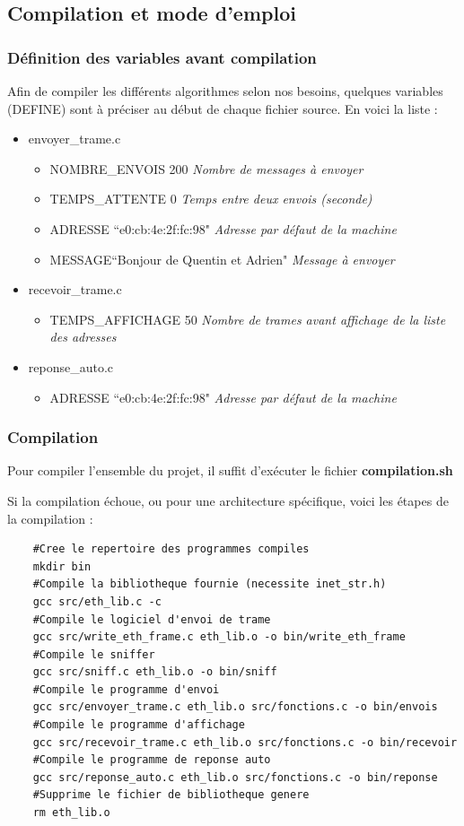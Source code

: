 \documentclass[a4paper,11pt]{article}
\begin{document}
	\subsection{Compilation et mode d'emploi}
		\subsubsection{Définition des variables avant compilation}
		Afin de compiler les différents algorithmes selon nos besoins, quelques variables (DEFINE) sont à préciser au début de chaque fichier source. En voici la liste :
		\begin{itemize}
		\item envoyer\_trame.c
			\begin{itemize}
			\item NOMBRE\_ENVOIS 200 \textit{Nombre de messages à envoyer}
			\item TEMPS\_ATTENTE 0    \textit{Temps entre deux envois (seconde)}
			\item ADRESSE ``e0:cb:4e:2f:fc:98" \textit{Adresse par défaut de la machine}
			\item MESSAGE``Bonjour de Quentin et Adrien" \textit{Message à envoyer}
			\end{itemize}
		\item recevoir\_trame.c
			\begin{itemize}
			\item TEMPS\_AFFICHAGE 50 \textit{Nombre de trames avant affichage de la liste des adresses}
			\end{itemize}
		\item reponse\_auto.c
			\begin{itemize}
			\item ADRESSE ``e0:cb:4e:2f:fc:98" \textit{Adresse par défaut de la machine}
			\end{itemize}
		\end{itemize}
		\subsubsection{Compilation}
		Pour compiler l'ensemble du projet, il suffit d'exécuter le fichier \textbf{compilation.sh}
		
		Si la compilation échoue, ou pour une architecture spécifique, voici les étapes de la compilation :
		\lstset{language=bash}
		\begin{lstlisting}
	#Cree le repertoire des programmes compiles
	mkdir bin
	#Compile la bibliotheque fournie (necessite inet_str.h)
	gcc src/eth_lib.c -c
	#Compile le logiciel d'envoi de trame
	gcc src/write_eth_frame.c eth_lib.o -o bin/write_eth_frame
	#Compile le sniffer
	gcc src/sniff.c eth_lib.o -o bin/sniff
	#Compile le programme d'envoi
	gcc src/envoyer_trame.c eth_lib.o src/fonctions.c -o bin/envois
	#Compile le programme d'affichage
	gcc src/recevoir_trame.c eth_lib.o src/fonctions.c -o bin/recevoir
	#Compile le programme de reponse auto
	gcc src/reponse_auto.c eth_lib.o src/fonctions.c -o bin/reponse
	#Supprime le fichier de bibliotheque genere
	rm eth_lib.o
		\end{lstlisting}
\end{document}
